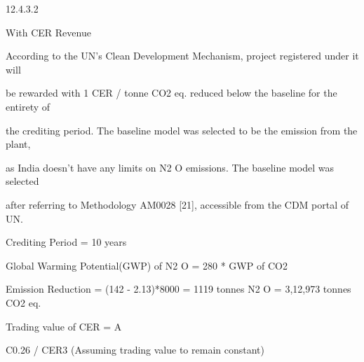 \documentclass[a4paper,portrait,12pt]{article}
\begin{document}
12.4.3.2





\begin{flushleft}
With CER Revenue
\end{flushleft}





\begin{flushleft}
According to the UN's Clean Development Mechanism, project registered under it will
\end{flushleft}


\begin{flushleft}
be rewarded with 1 CER / tonne CO2 eq. reduced below the baseline for the entirety of
\end{flushleft}


\begin{flushleft}
the crediting period. The baseline model was selected to be the emission from the plant,
\end{flushleft}


\begin{flushleft}
as India doesn't have any limits on N2 O emissions. The baseline model was selected
\end{flushleft}


\begin{flushleft}
after referring to Methodology AM0028 [21], accessible from the CDM portal of UN.
\end{flushleft}


\begin{flushleft}
Crediting Period = 10 years
\end{flushleft}


\begin{flushleft}
Global Warming Potential(GWP) of N2 O = 280 * GWP of CO2
\end{flushleft}


\begin{flushleft}
Emission Reduction = (142 - 2.13)*8000 = 1119 tonnes N2 O = 3,12,973 tonnes CO2 eq.
\end{flushleft}


\begin{flushleft}
Trading value of CER = A
\end{flushleft}


\begin{flushleft}
C0.26 / CER3 (Assuming trading value to remain constant)
\end{flushleft}
\end{document}

